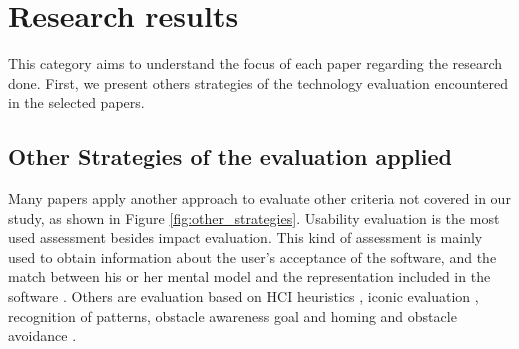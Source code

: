  	\begin{figure}[h] 
   	    \captionsetup{width=12cm}%
	\end{figure}

\section{Research results}
\label{sec:results-research}
This category aims to understand the focus of each paper regarding the research done. First, we present others strategies of the technology evaluation encountered in the selected papers. 

\subsection{Other Strategies of the evaluation applied}
\label{subsec:results-other-strategies}

Many papers apply another approach to evaluate other criteria not covered in our study, as shown in Figure \ref{fig:other_strategies}. Usability evaluation is the most used assessment besides impact evaluation. This kind of assessment is mainly used to obtain information about the user's acceptance of the software, and the match between his or her mental model and the representation included in the software \cite{Sanchez2009a}. Others are evaluation based on HCI heuristics \cite{Shafiq2014}, iconic evaluation \cite{Sanchez2011}, recognition of patterns, obstacle awareness goal and homing and obstacle avoidance \cite{Pissaloux2017TowardsDevices}.

